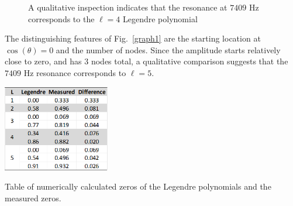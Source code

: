 \documentclass[12pt]{article}
\newcommand{\figref}[1]{Fig.\ \ref{#1}}
\begin{document}
	\begin{figure}[H]
		\centering
		\qquad
		\caption{A qualitative inspection indicates that the resonance at $7409$ Hz corresponds to the $\ell=4$ Legendre polynomial}
		\label{comparison}
	\end{figure}
	
	\pagebreak
	
	The distinguishing features of \figref{graph1} are the starting location at $\cos(\theta) = 0$ and the number of nodes. Since the amplitude starts relatively close to zero, and has $3$ nodes total, a qualitative comparison suggests that the $7409$ Hz resonance corresponds to $\ell=5$.
	
	
	\begin{table}
		\includegraphics[width=0.35\textwidth]{Tables/LegendreTable.png}
		\caption{Table of numerically calculated zeros of the Legendre polynomials and the measured zeros.}
		\label{legendreTable}
	\end{table}
	
\end{document}
